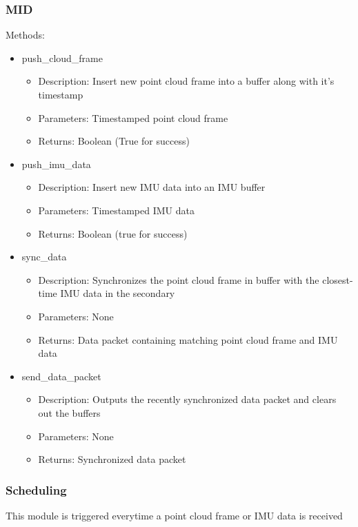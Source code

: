 \documentclass[11pt]{article}
\begin{document}
			\subsubsection{MID}
				Methods:
				\begin{itemize}
					\item push\_cloud\_frame
						\begin{itemize}
							\item Description: Insert new point cloud frame into a buffer along with it's timestamp 
							\item Parameters: Timestamped point cloud frame
							\item Returns: Boolean (True for success)
						\end{itemize}
					\item push\_imu\_data
						\begin{itemize}
							\item Description: Insert new IMU data into an IMU buffer
							\item Parameters: Timestamped IMU data 
							\item Returns: Boolean (true for success)
						\end{itemize}
					
					\item sync\_data
							\begin{itemize}
								\item Description: Synchronizes the point cloud frame in buffer with the closest-time IMU data in the secondary  
								\item Parameters: None 
								\item Returns: Data packet containing matching point cloud frame and IMU data
							\end{itemize} 
					\item send\_data\_packet
						\begin{itemize}
							\item Description: Outputs the recently synchronized data packet and clears out the buffers
							\item Parameters: None
							\item Returns: Synchronized data packet
						\end{itemize}
				\end{itemize}
			\subsubsection{Scheduling}
				This module is triggered everytime a point cloud frame or IMU data is received
		
\end{document}
